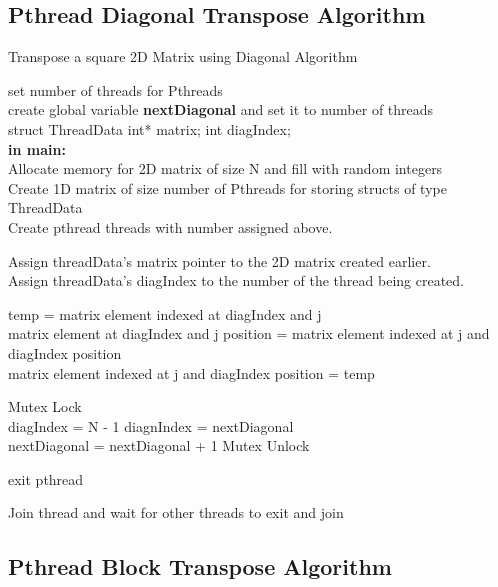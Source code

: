 \documentclass[10pt,onecolumn]{article}
\begin{document}
\subsection{Pthread Diagonal Transpose Algorithm}
%
\begin{algorithm}[H]
    \caption{Transpose a square 2D Matrix using Diagonal Algorithm}
    set number of threads for Pthreads\\
    create global variable \textbf{nextDiagonal} and set it to number of threads \\
    struct ThreadData{ int* matrix; int diagIndex;} \\
    
    \textbf{in main:} \\
    Allocate memory for 2D matrix of size N and fill with random integers \\
    Create 1D matrix of size number of Pthreads for storing structs of type ThreadData \\
    Create pthread threads with number assigned above.\\
    
    {   
        Assign threadData's matrix pointer to the 2D matrix created earlier.\\
        Assign threadData's diagIndex to the number of the thread being created.\\
        {
            {
                temp = matrix element indexed at diagIndex and j \\
                matrix element at diagIndex and j position = matrix element indexed at j and diagIndex position \\
                matrix element indexed at j and diagIndex position = temp
            }
            
            Mutex Lock\\
             {diagIndex = N - 1}
            \Else
            { 
                diagnIndex = nextDiagonal \\
                nextDiagonal = nextDiagonal + 1
            }
            Mutex Unlock\\
            
        }
        exit pthread
    }
    
    {
        Join thread and wait for other threads to exit and join
    }
\end{algorithm}
%
\subsection{Pthread Block Transpose Algorithm}
%

%
\end{document}
